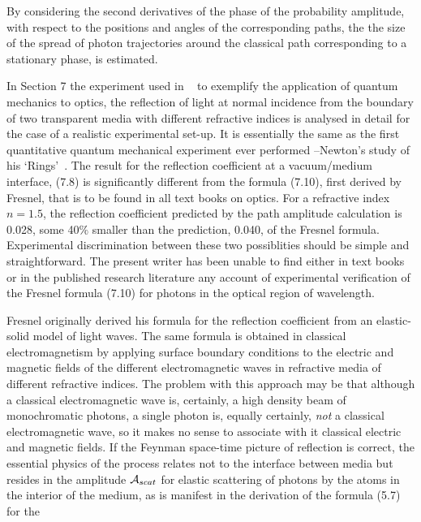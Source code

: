 { By considering the second 
   derivatives of the phase of the probability amplitude, with respect to the positions
  and angles of the corresponding paths, the the size of the spread of photon trajectories
   around the classical path corresponding to a stationary phase, is estimated.
   \par In Section 7 the experiment used in ~\cite{Feyn1} to exemplify the application
  of quantum mechanics to optics, the reflection of light at normal incidence from the boundary
  of two transparent media with different refractive indices is analysed in detail for the 
  case of a realistic experimental set-up. It is essentially the same as the first 
   quantitative quantum mechanical experiment ever performed --Newton's
   study of his `Rings'~\cite{Newton}. The result for the reflection coefficient at a vacuum/medium
   interface, (7.8) is significantly different from the formula (7.10), first derived by Fresnel, that
   is to be found in all text books on optics. For a refractive index $n= 1.5$, the reflection
   coefficient predicted by the path amplitude calculation is 0.028, some 40$\%$ smaller than the
    prediction, 0.040, of the Fresnel formula. Experimental discrimination between these two possiblities
    should be simple and straightforward. The present writer has been unable to find either in
    text books or in the published research literature any account of experimental verification of the
    Fresnel formula (7.10) for photons in the optical region of wavelength.
     \par Fresnel originally derived his formula for the reflection coefficient from
    an elastic-solid model of light waves. The same formula is obtained in 
    classical electromagnetism by applying surface
    boundary conditions to the electric and magnetic fields of the different electromagnetic waves
     in refractive
    media of different refractive indices. The problem with this approach may be that
   although a classical electromagnetic wave is, certainly, a high density beam of
    monochromatic photons, a single photon is, equally certainly, {\it not} a classical
   electromagnetic wave, so it makes no sense to associate with it classical
  electric and magnetic fields. If the Feynman space-time picture of reflection is correct,
   the essential physics of the process relates not to the interface
   between media but resides in the amplitude ${\cal A}_{scat}$ for elastic scattering of
   photons by the atoms in the interior of the medium, as is manifest in the derivation
   of the  formula (5.7) for the
}
